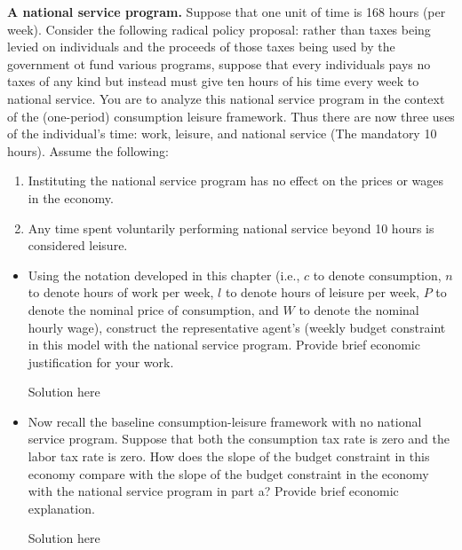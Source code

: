 \documentclass[11pt]{SelfArxOneColBMN}
\begin{document}
\begin{exercise}
	\textbf{A national service program.} Suppose that one unit of time is 168 hours (per week). Consider the following radical policy proposal: rather than taxes being levied on individuals and the proceeds of those taxes being used by the government ot fund various programs, suppose that every individuals pays no taxes of any kind but instead must give ten hours of his time every week to national service. You are to analyze this national service program in the context of the (one-period) consumption leisure framework. Thus there are now three uses of the individual's time: work, leisure, and national service (The mandatory 10 hours). Assume the following:
	\begin{enumerate}
		\item Instituting the national service program has no effect on the prices or wages in the economy.
		\item Any time spent voluntarily performing national service beyond 10 hours is considered leisure.
	\end{enumerate}
	\begin{itemize}
		\item Using the notation developed in this chapter (i.e., $c$ to denote consumption, $n$ to denote hours of work per week, $l$ to denote hours of leisure per week, $P$ to denote the nominal price of consumption, and $W$ to denote the nominal hourly wage), construct the representative agent's (weekly budget constraint in this model with the national service program. Provide brief economic justification for your work.
		\begin{solution}
			Solution here
		\end{solution}
		\item Now recall the baseline consumption-leisure framework with no national service program. Suppose that both the consumption tax rate is zero and the labor tax rate is zero. How does the slope of the budget constraint in this economy compare with the slope of the budget constraint in the economy with the national service program in part a? Provide brief economic explanation.
		\begin{solution}
			Solution here
		\end{solution}
	\end{itemize}
\end{exercise}
\end{document}
